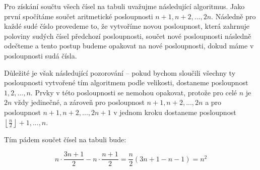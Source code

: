 \documentclass{fkssolpub}
\author{Ondřej Sedláček}
\begin{document}
Pro získání součtu všech čísel na tabuli uvažujme následující algoritmus.
Jako první spočítáme součet aritmetické posloupnosti $n + 1, n + 2, ...,
	2n$. Následně pro každé sudé číslo provedeme to, že vytvoříme novou posloupnost,
která zahrnuje poloviny sudých čísel předchozí posloupnosti, součet nové
posloupnosti následně odečteme a tento postup budeme opakovat na nové
posloupnosti, dokud máme v posloupnosti sudá čísla.

Důležité je však následující pozorování -- pokud bychom sloučili všechny ty
posloupnosti vytvořené tím algoritmem podle velikosti, dostaneme posloupnost
$1, 2, ..., n$. Prvky v této posloupnosti se nemohou opakovat, protože
pro celé $n$ je $2n$ vždy jedinečné, a zároveň pro posloupnost $n + 1,
	n + 2, ..., 2n$ a pro posloupnost $n + 1, n + 2, ..., 2n + 1$ v jednom
kroku dostaneme posloupnost $\left\lfloor \frac{n}{2} \right\rfloor + 1, ..., n$.

Tím pádem součet čísel na tabuli bude:

\[
	n \cdot \frac{3n + 1}{2} - n \cdot \frac{n + 1}{2}
	= \frac{n}{2} (3n + 1 - n - 1) = n^2
\]
\end{document}
